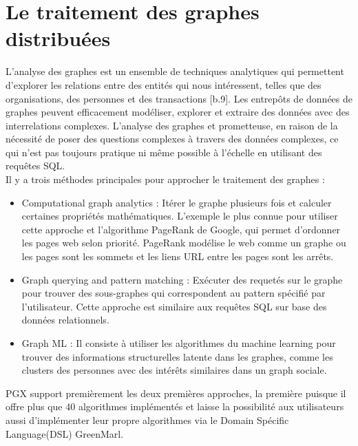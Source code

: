 \section{Le traitement des graphes distribuées}
L'analyse des graphes est un ensemble de techniques analytiques qui permettent d'explorer les relations entre des entités qui nous intéressent, telles que des organisations, des personnes et des transactions [b.9]. Les entrepôts de données de graphes peuvent efficacement modéliser, explorer et extraire des données avec des interrelations complexes. L'analyse des graphes et prometteuse, en raison de la nécessité de poser des questions complexes à travers des données complexes, ce qui n'est pas toujours pratique ni même possible à l'échelle en utilisant des requêtes SQL.\\
Il y a trois méthodes principales pour approcher le traitement des graphes :

\begin{itemize}[label=\textbullet]
\item  Computational graph analytics : Itérer le graphe plusieurs fois et calculer certaines propriétés mathématiques. L’exemple le plus connue pour utiliser cette approche et l’algorithme PageRank de Google, qui permet d’ordonner les pages web selon priorité. PageRank modélise le web comme un graphe ou les pages sont les sommets et les liens URL entre les pages sont les arrêts.
\item  Graph querying and pattern matching : Exécuter des requetés sur le graphe pour trouver des sous-graphes qui correspondent au pattern spécifié par l’utilisateur. Cette approche est similaire aux requêtes SQL sur base des données relationnels.
\item  Graph ML : Il consiste à utiliser les algorithmes du machine learning pour trouver des informations structurelles latente dans les graphes, comme les clusters des personnes avec des intérêts similaires dans un graph sociale.
\end{itemize}

PGX support premièrement les deux premières approches, la première puisque il offre plus que 40 algorithmes implémentés et laisse la possibilité aux utilisateurs aussi d’implémenter leur propre algorithmes via le Domain Spécific Language(DSL) GreenMarl.
